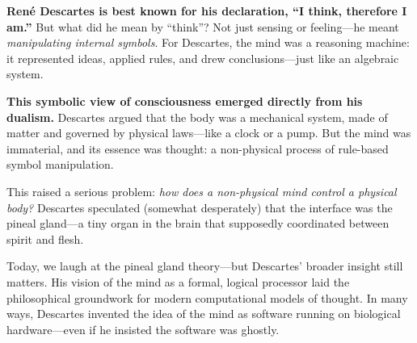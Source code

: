 \begin{tcolorbox}[colback=blue!5!white, colframe=blue!50!black, title=Historical Sidebar: Descartes and the Symbolic Soul]

    \textbf{René Descartes is best known for his declaration, “I think, therefore I am.”} But what did he mean by “think”? Not just sensing or feeling—he meant \emph{manipulating internal symbols}. For Descartes, the mind was a reasoning machine: it represented ideas, applied rules, and drew conclusions—just like an algebraic system.
  
    \medskip
  
    \textbf{This symbolic view of consciousness emerged directly from his dualism.} Descartes argued that the body was a mechanical system, made of matter and governed by physical laws—like a clock or a pump. But the mind was immaterial, and its essence was thought: a non-physical process of rule-based symbol manipulation.
  
    \medskip
  
    This raised a serious problem: \emph{how does a non-physical mind control a physical body?} Descartes speculated (somewhat desperately) that the interface was the pineal gland—a tiny organ in the brain that supposedly coordinated between spirit and flesh.
  
    \medskip
  
    Today, we laugh at the pineal gland theory—but Descartes’ broader insight still matters. His vision of the mind as a formal, logical processor laid the philosophical groundwork for modern computational models of thought. In many ways, Descartes invented the idea of the mind as software running on biological hardware—even if he insisted the software was ghostly.
  
\end{tcolorbox}